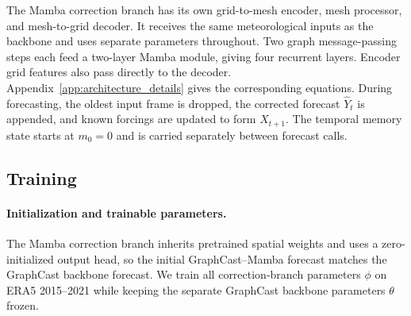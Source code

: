 \documentclass{article}
\newcommand{\vfourchange}[1]{{\color{blue}#1}}
\newcommand{\vfourred}[1]{{\color{red}#1}}
\newif\ifvfivechanges
\newcommand{\vfiveidentity}[1]{#1}
\DeclareRobustCommand{\vfiveadded}[1]{\ifvfivechanges{\color{vfiveAdded}%
  \let\vfourchange\vfiveidentity\let\vfourred\vfiveidentity#1}\else{\color{blue}%
  \let\vfourchange\vfiveidentity\let\vfourred\vfiveidentity#1}\fi}
\begin{document}
\fi
\ifvfivechanges
\par\begingroup\color{vfiveDeleted}
\noindent\textit{Detailed equations moved to Appendix A.2.}
\begin{gather*}
\text{\sout{\ensuremath{L_t^{(0)} = \operatorname{Encode}_\phi(X_t),}}}\\
\text{\sout{\ensuremath{\widetilde{L}_t^{(k)} = \operatorname{GNN}^{(k)}_\phi(L_t^{(k-1)}),}}}\\
\text{\sout{\ensuremath{(L_t^{(k)},m_t^{(k)}) =\operatorname{MambaModule}^{(k)}_\phi (\widetilde{L}_t^{(k)},m_{t-1}^{(k)}),\qquad k=1,2,}}}\\
\text{\sout{\ensuremath{c_t = \operatorname{Decode}_\phi(L_t^{(2)}).}}}
\end{gather*}
\endgroup
\fi
\ifvfivechanges
\par\begingroup\color{vfiveDeleted}\noindent
\sout{Each Mamba module contains two residual Mamba layers; $m_t^{(k)}$ comprises their SSM states and causal-convolution caches. The output head is initialized to zero, so the initial GraphCast--Mamba forecast equals the GraphCast backbone forecast. During autoregressive forecasting, the oldest input frame is dropped, the GraphCast--Mamba forecast $\hat{Y}_t$ is appended, and the known forcings are updated to form $X_{t+1}$. The temporal memory state is passed separately to the next correction-branch call. The cold-start rollout illustrated in Figure~\mbox{\ref{fig:GC_Mamba_rollout}} begins with $m_0=0$ and retains the updated temporal memory state thereafter.}
\par\endgroup
\fi
\vfiveadded{The Mamba correction branch has its own grid-to-mesh encoder, mesh processor, and mesh-to-grid decoder. It receives the same meteorological inputs as the backbone and uses separate parameters throughout. Two graph message-passing steps each feed a two-layer Mamba module, giving four recurrent layers. Encoder grid features also pass directly to the decoder. Appendix~\ref{app:architecture_details} gives the corresponding equations. During forecasting, the oldest input frame is dropped, the corrected forecast $\hat{Y}_t$ is appended, and known forcings are updated to form $X_{t+1}$. The temporal memory state starts at $m_0=0$ and is carried separately between forecast calls.}


\subsection{Training}
\label{sec:training}
\paragraph{Initialization and trainable parameters.}
The Mamba correction branch inherits pretrained spatial weights and uses a zero-initialized output head, so the initial GraphCast--Mamba forecast matches the GraphCast backbone forecast. We train all correction-branch parameters $\phi$ on ERA5 2015--2021 while keeping the separate GraphCast backbone parameters $\theta$ frozen.
\end{document}
